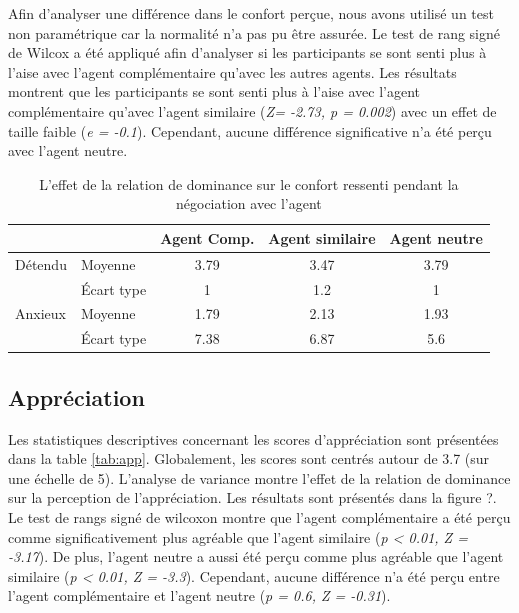 		Afin d'analyser une différence dans le confort perçue, nous avons utilisé un test non paramétrique car la normalité n'a pas pu être assurée. Le test de rang signé de Wilcox a été appliqué afin d'analyser si les participants se sont senti plus à l'aise avec l'agent complémentaire qu'avec les autres agents. 
		Les résultats montrent que les participants se sont senti plus à l'aise avec l'agent complémentaire qu'avec l'agent similaire (\emph{Z= -2.73, p = 0.002})
		avec un effet de taille faible (\emph{e = -0.1}). Cependant, aucune différence significative n'a été perçu avec l'agent neutre. 
	
		\begin{table}[h]
			\caption{L'effet de la relation de dominance sur le confort ressenti pendant la négociation avec l'agent} 
			\centering
			
			\begin{tabular}{ l l c c c  }
				\hline
				\textbf{ }& & \textbf{Agent Comp.} & \textbf{Agent similaire} & \textbf{Agent neutre} \\ 
				\hline
				\newline \newline\multirow{2}{*} {Détendu} & Moyenne &3.79 & 3.47 & 3.79 \\
				\newline  & Écart type & 1 & 1.2 & 1 \\
				\hline

				\newline \newline\multirow{2}{*} {Anxieux} & Moyenne & 1.79 & 2.13 & 1.93 \\
				\newline  & Écart type & 7.38 & 6.87 & 5.6 \\
				\hline
			\end{tabular}
			
			\label{tab:confort}
		\end{table}
	\subsection{Appréciation}
		Les statistiques descriptives concernant les scores d’appréciation sont présentées dans la table \ref{tab:app}. Globalement,
		les scores sont centrés autour de 3.7 (sur une échelle de 5). L'analyse de variance montre l'effet de la relation de dominance sur la perception de l'appréciation. Les résultats sont présentés dans la figure ?.
		 Le test de rangs signé de wilcoxon montre que l'agent complémentaire a été perçu comme significativement plus agréable que l'agent similaire (\emph{p < 0.01, Z = -3.17}). De plus, l'agent neutre a aussi été perçu comme plus agréable que l'agent similaire (\emph{p < 0.01, Z = -3.3}). Cependant, aucune différence n'a été perçu entre l'agent complémentaire et l'agent neutre (\emph{p = 0.6, Z = -0.31}).
	
